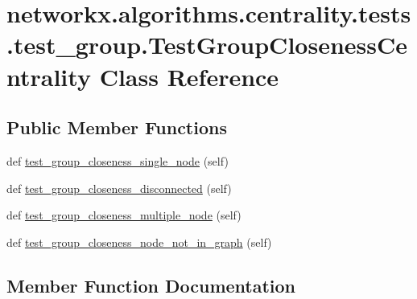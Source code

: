 \hypertarget{classnetworkx_1_1algorithms_1_1centrality_1_1tests_1_1test__group_1_1TestGroupClosenessCentrality}{}\section{networkx.\+algorithms.\+centrality.\+tests.\+test\+\_\+group.\+Test\+Group\+Closeness\+Centrality Class Reference}
\label{classnetworkx_1_1algorithms_1_1centrality_1_1tests_1_1test__group_1_1TestGroupClosenessCentrality}
\subsection*{Public Member Functions}
\begin{DoxyCompactItemize}
\item 
def \hyperlink{classnetworkx_1_1algorithms_1_1centrality_1_1tests_1_1test__group_1_1TestGroupClosenessCentrality_a1cf398f7dbeed135c7b054dbba58bf3d}{test\+\_\+group\+\_\+closeness\+\_\+single\+\_\+node} (self)
\item 
def \hyperlink{classnetworkx_1_1algorithms_1_1centrality_1_1tests_1_1test__group_1_1TestGroupClosenessCentrality_a3e91e4a3d15f2686a3da3b93cf81b5ad}{test\+\_\+group\+\_\+closeness\+\_\+disconnected} (self)
\item 
def \hyperlink{classnetworkx_1_1algorithms_1_1centrality_1_1tests_1_1test__group_1_1TestGroupClosenessCentrality_a3e486ed94c786640e7bb01aaf9c6885d}{test\+\_\+group\+\_\+closeness\+\_\+multiple\+\_\+node} (self)
\item 
def \hyperlink{classnetworkx_1_1algorithms_1_1centrality_1_1tests_1_1test__group_1_1TestGroupClosenessCentrality_a0c35794ea9f0e5d70082c0d988b6ea50}{test\+\_\+group\+\_\+closeness\+\_\+node\+\_\+not\+\_\+in\+\_\+graph} (self)
\end{DoxyCompactItemize}


\subsection{Member Function Documentation}
\mbox{\label{classnetworkx_1_1algorithms_1_1centrality_1_1tests_1_1test__group_1_1TestGroupClosenessCentrality_a3e91e4a3d15f2686a3da3b93cf81b5ad}} 
